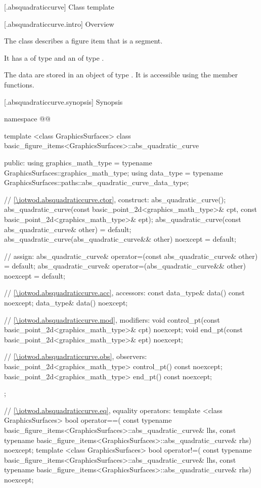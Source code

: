  [\iotwod.absquadraticcurve] {Class template }

 [\iotwod.absquadraticcurve.intro] {Overview}

\pnum
{}%
The class  describes a figure item that is a segment.

\pnum
It has a  of type  and an  of type .

\pnum
The data are stored in an object of type . It is accessible using the  member functions.

 [\iotwod.absquadraticcurve.synopsis] {Synopsis}
\begin{codeblock}
namespace @\fullnamespace{}@ {
  template <class GraphicsSurfaces>
  class basic_figure_items<GraphicsSurfaces>::abs_quadratic_curve {
  public:
    using graphics_math_type = typename GraphicsSurfaces::graphics_math_type;
    using data_type =
      typename GraphicsSurfaces::paths::abs_quadratic_curve_data_type;

    // \ref{\iotwod.absquadraticcurve.ctor}, construct:
    abs_quadratic_curve();
    abs_quadratic_curve(const basic_point_2d<graphics_math_type>& cpt,
      const basic_point_2d<graphics_math_type>& ept);
    abs_quadratic_curve(const abs_quadratic_curve& other) = default;
    abs_quadratic_curve(abs_quadratic_curve&& other) noexcept = default;

    // assign:
    abs_quadratic_curve& operator=(const abs_quadratic_curve& other) = default;
    abs_quadratic_curve& operator=(abs_quadratic_curve&& other) noexcept = default;

    // \ref{\iotwod.absquadraticcurve.acc}, accessors:
    const data_type& data() const noexcept;
    data_type& data() noexcept;

    // \ref{\iotwod.absquadraticcurve.mod}, modifiers:
    void control_pt(const basic_point_2d<graphics_math_type>& cpt) noexcept;
    void end_pt(const basic_point_2d<graphics_math_type>& ept) noexcept;

    // \ref{\iotwod.absquadraticcurve.obs}, observers:
    basic_point_2d<graphics_math_type> control_pt() const noexcept;
    basic_point_2d<graphics_math_type> end_pt() const noexcept;
  };

  // \ref{\iotwod.absquadraticcurve.eq}, equality operators:
  template <class GraphicsSurfaces>
  bool operator==(
    const typename basic_figure_items<GraphicsSurfaces>::abs_quadratic_curve& lhs,
    const typename basic_figure_items<GraphicsSurfaces>::abs_quadratic_curve& rhs) 
    noexcept;  
  template <class GraphicsSurfaces>
  bool operator!=(
    const typename basic_figure_items<GraphicsSurfaces>::abs_quadratic_curve& lhs,
    const typename basic_figure_items<GraphicsSurfaces>::abs_quadratic_curve& rhs) 
    noexcept;  
}
\end{codeblock}

